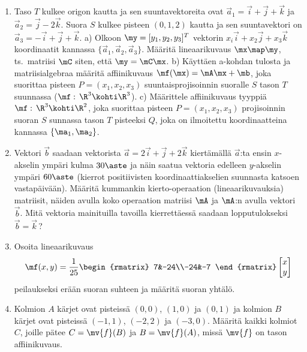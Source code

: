 \begin{enumerate}
\item
Taso $T$ kulkee origon kautta ja sen suuntavektoreita ovat $\vec a_1=\vec i+\vec j+\vec k$ ja
$\vec a_2=\vec j-2\vec k$. Suora $S$ kulkee pisteen $(0,1,2)$ kautta ja sen suuntavektori on
$\vec a_3=-\vec i+\vec j+\vec k$. \vspace{1mm}\newline
a) Olkoon $\my=[y_1,y_2,y_3]^T$ vektorin $x_i\vec i+x_2\vec j+x_3\vec k$ koordinaatit kannassa
$\{\vec a_1,\vec a_2,\vec a_3\}$. Määritä lineaarikuvaus $\mx\map\my$, ts.\ matriisi $\mC$
siten, että $\my=\mC\mx$. \newline
b) Käyttäen a-kohdan tulosta ja matriisialgebraa määritä affiinikuvaus $\mf(\mx)=\mA\mx+\mb$,
joka suorittaa pisteen $P=(x_1,x_2,x_3)$ suuntaisprojisoinnin suoralle $S$ tason $T$
suunnassa ($\mf:\,\R^3\kohti\R^3$). \newline
c) Määrittele affiinikuvaus tyyppiä $\mf:\,\R^3\kohti\R^2$, joka suorittaa pisteen
$P=(x_1,x_2,x_3)$ projisoinnin suoran $S$ sunnassa tason $T$ pisteeksi $Q$, joka on ilmoitettu
koordinaatteina kannassa $\{\ma_1,\ma_2\}$. 

\item
Vektori $\vec b$ saadaan vektorista $\vec a=2\vec i+\vec j+2\vec k$ kiertämällä $\vec a$:ta
ensin $x$-akselin ympäri kulma $30\aste$ ja näin saatua vektoria edelleen $y$-akselin ympäri
$60\aste$ (kierrot positiivisten koordinaattiakselien suunnasta katsoen vastapäivään). Määritä
kummankin kierto-operaation (lineaarikuvauksia) matriisit, näiden avulla koko operaation
matriisi $\mA$ ja $\mA$:n avulla vektori $\vec b$. Mitä vektoria mainituilla tavoilla
kierrettäessä saadaan lopputulokseksi $\vec b=\vec k$\,?

\item
Osoita lineaarikuvaus
\[
\mf(x,y)=\frac{1}{25}\begin{rmatrix} 7&-24\\-24&-7 \end{rmatrix} 
                     \begin{bmatrix} x\\y \end{bmatrix}
\]
peilaukseksi erään suoran suhteen ja määritä suoran yhtälö.

\item
Kolmion $A$ kärjet ovat pisteissä $(0,0)$, $(1,0)$ ja $(0,1)$ ja kolmion $B$ kärjet ovat 
pisteissä $(-1,1)$, $(-2,2)$ ja $(-3,0)$. Määritä kaikki kolmiot $C$, joille pätee $C=\mv{f}(B)$
ja $B=\mv{f}(A)$, missä $\mv{f}$ on tason affiinikuvaus.


\end{enumerate}
